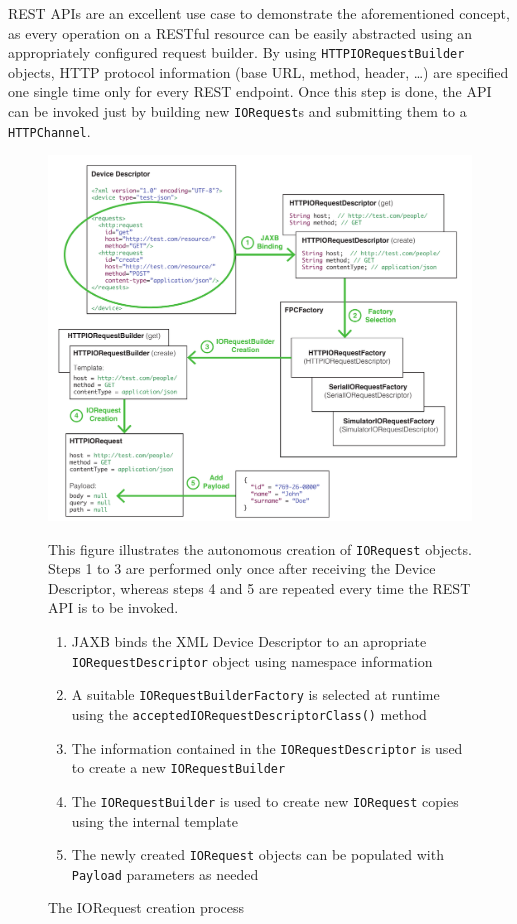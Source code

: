 REST APIs are an excellent use case to demonstrate the aforementioned concept,
as every operation on a RESTful resource can be easily abstracted using an
appropriately configured request builder. By using
\texttt{HTTPIORequestBuilder} objects, HTTP protocol information (base URL,
method, header, \ldots) are specified one single time only for
every REST endpoint. Once this step is done, the API can be invoked just by
building new \texttt{IORequest}s and submitting them to a \texttt{HTTPChannel}.

\begin{figure}[!hbt]
\includegraphics[width=\textwidth]{imgs/iorequest_creation_process.pdf}
\caption{The IORequest creation process}
\label{fig:iorequest.creation}
{
\begin{figurenote}
This figure illustrates the autonomous creation of \texttt{IORequest} objects.
Steps 1 to 3 are performed only once after receiving the Device Descriptor,
whereas steps 4 and 5 are repeated every time the REST API is to be invoked.
\begin{enumerate}
  \itemsep0em
  \item JAXB binds the XML Device Descriptor to an apropriate
\texttt{IORequestDescriptor} object using namespace information \item A
suitable \texttt{IORequestBuilderFactory} is selected at runtime using the
\texttt{acceptedIORequestDescriptorClass()} method
  \item The information contained in the \texttt{IORequestDescriptor} is used
to create a new \texttt{IORequestBuilder} \item The \texttt{IORequestBuilder}
is used to create new \texttt{IORequest} copies using the internal template
  \item The newly created \texttt{IORequest} objects can be populated with
\texttt{Payload} parameters as needed \end{enumerate}
\end{figurenote}
}
\end{figure}

